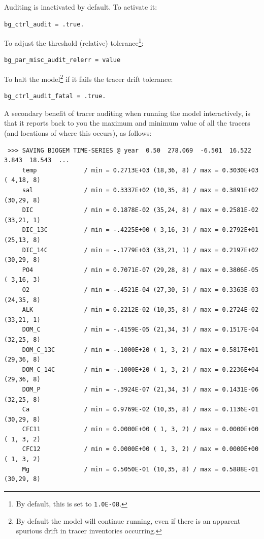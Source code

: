 \documentclass[11pt,fleqn]{book} %
\begin{document}
Auditing is inactivated by default. To activate it:
\vspace{-2mm}\small\begin{verbatim}
bg_ctrl_audit = .true.
\end{verbatim}\normalsize\vspace{-2mm}

To adjust the threshold (relative) tolerance\footnote{By default, this is set to \texttt{1.0E-08}.}:
\vspace{-2mm}\small\begin{verbatim}
bg_par_misc_audit_relerr = value
\end{verbatim}\normalsize\vspace{-2mm}

To halt the model\footnote{By default the model will continue running, even if there is an apparent spurious drift in tracer inventories occurring.} if it fails the tracer drift tolerance:
\vspace{-2mm}\small\begin{verbatim}
bg_ctrl_audit_fatal = .true.
\end{verbatim}\normalsize\vspace{-2mm}

A secondary benefit of tracer auditing when running the model interactively, is that it reports back to you the maximum and minimum value of all the tracers (and locations of where this occurs), as follows:

\vspace{-2mm}\footnotesize\begin{verbatim}
 >>> SAVING BIOGEM TIME-SERIES @ year  0.50  278.069  -6.501  16.522  3.843  18.543  ...
     temp             / min = 0.2713E+03 (18,36, 8) / max = 0.3030E+03 ( 4,18, 8)
     sal              / min = 0.3337E+02 (10,35, 8) / max = 0.3891E+02 (30,29, 8)
     DIC              / min = 0.1878E-02 (35,24, 8) / max = 0.2581E-02 (33,21, 1)
     DIC_13C          / min = -.4225E+00 ( 3,16, 3) / max = 0.2792E+01 (25,13, 8)
     DIC_14C          / min = -.1779E+03 (33,21, 1) / max = 0.2197E+02 (30,29, 8)
     PO4              / min = 0.7071E-07 (29,28, 8) / max = 0.3806E-05 ( 3,16, 3)
     O2               / min = -.4521E-04 (27,30, 5) / max = 0.3363E-03 (24,35, 8)
     ALK              / min = 0.2212E-02 (10,35, 8) / max = 0.2724E-02 (33,21, 1)
     DOM_C            / min = -.4159E-05 (21,34, 3) / max = 0.1517E-04 (32,25, 8)
     DOM_C_13C        / min = -.1000E+20 ( 1, 3, 2) / max = 0.5817E+01 (29,36, 8)
     DOM_C_14C        / min = -.1000E+20 ( 1, 3, 2) / max = 0.2236E+04 (29,36, 8)
     DOM_P            / min = -.3924E-07 (21,34, 3) / max = 0.1431E-06 (32,25, 8)
     Ca               / min = 0.9769E-02 (10,35, 8) / max = 0.1136E-01 (30,29, 8)
     CFC11            / min = 0.0000E+00 ( 1, 3, 2) / max = 0.0000E+00 ( 1, 3, 2)
     CFC12            / min = 0.0000E+00 ( 1, 3, 2) / max = 0.0000E+00 ( 1, 3, 2)
     Mg               / min = 0.5050E-01 (10,35, 8) / max = 0.5888E-01 (30,29, 8)
\end{verbatim}\normalsize
\end{document}
